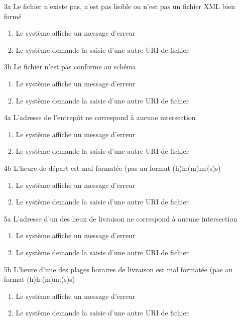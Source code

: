 \begin{itemize}
\item[3a] Le fichier n'existe pas, n'est pas lisible ou n'est pas un fichier XML bien formé
\begin{enumerate}
\item Le système affiche un message d'erreur
\item Le système demande la saisie d'une autre URI de fichier
\end{enumerate}

\item[3b] Le fichier n'est pas conforme au schéma
\begin{enumerate}
\item Le système affiche un message d'erreur
\item Le système demande la saisie d'une autre URI de fichier
\end{enumerate}

\item[4a] L'adresse de l'entrepôt ne correspond à aucune intersection
\begin{enumerate}
\item Le système affiche un message d'erreur
\item Le système demande la saisie d'une autre URI de fichier
\end{enumerate}

\item[4b] L'heure de départ est mal formatée (pas au format (h)h:(m)m:(s)s)
\begin{enumerate}
\item Le système affiche un message d'erreur
\item Le système demande la saisie d'une autre URI de fichier
\end{enumerate}

\item[5a] L'adresse d'un des lieux de livraison ne correspond à aucune intersection
\begin{enumerate}
\item Le système affiche un message d'erreur
\item Le système demande la saisie d'une autre URI de fichier
\end{enumerate}

\item[5b] L'heure d'une des plages horaires de livraison est mal formatée (pas au format (h)h:(m)m:(s)s)
\begin{enumerate}
\item Le système affiche un message d'erreur
\item Le système demande la saisie d'une autre URI de fichier
\end{enumerate}
\end{itemize}


